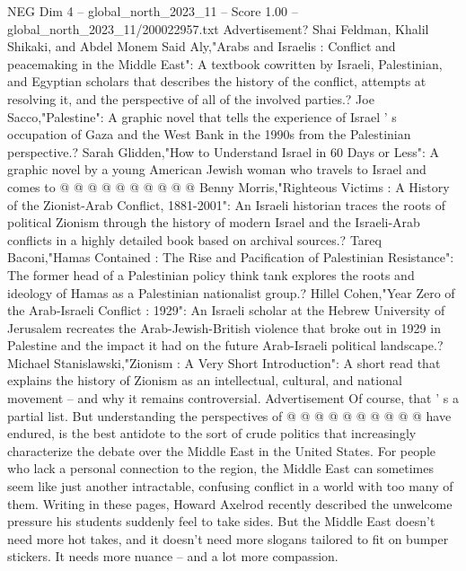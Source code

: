 \begin{textsample}{NEG Dim 4 – global\_north\_2023\_11 – Score 1.00 – global\_north\_2023\_11/200022957.txt}
Advertisement?
Shai Feldman, Khalil Shikaki, and Abdel Monem Said Aly,"Arabs and Israelis : Conflict and peacemaking in the Middle East": A textbook cowritten by Israeli, Palestinian, and Egyptian scholars that describes the history of the conflict, attempts at resolving it, and the perspective of all of the involved parties.?
Joe Sacco,"Palestine": A graphic novel that tells the experience of Israel ' s occupation of Gaza and the West Bank in the 1990s from the Palestinian perspective.?
Sarah Glidden,"How to Understand Israel in 60 Days or Less": A graphic novel by a young American Jewish woman who travels to Israel and comes to @ @ @ @ @ @ @ @ @ @ Benny Morris,"Righteous Victims : A History of the Zionist-Arab Conflict, 1881-2001": An Israeli historian traces the roots of political Zionism through the history of modern Israel and the Israeli-Arab conflicts in a highly detailed book based on archival sources.?
Tareq Baconi,"Hamas Contained : The Rise and Pacification of Palestinian Resistance": The former head of a Palestinian policy think tank explores the roots and ideology of Hamas as a Palestinian nationalist group.?
Hillel Cohen,"Year Zero of the Arab-Israeli Conflict : 1929": An Israeli scholar at the Hebrew University of Jerusalem recreates the Arab-Jewish-British violence that broke out in 1929 in Palestine and the impact it had on the future Arab-Israeli political landscape.?
Michael Stanislawski,"Zionism : A Very Short Introduction": A short read that explains the history of Zionism as an intellectual, cultural, and national movement -- and why it remains controversial.
Advertisement Of course, that ' s a partial list.
But understanding the perspectives of @ @ @ @ @ @ @ @ @ @ have endured, is the best antidote to the sort of crude politics that increasingly characterize the debate over the Middle East in the United States.
For people who lack a personal connection to the region, the Middle East can sometimes seem like just another intractable, confusing conflict in a world with too many of them.
Writing in these pages, Howard Axelrod recently described the unwelcome pressure his students suddenly feel to take sides.
But the Middle East doesn't need more hot takes, and it doesn't need more slogans tailored to fit on bumper stickers.
It needs more nuance -- and a lot more compassion.

\end{textsample}
